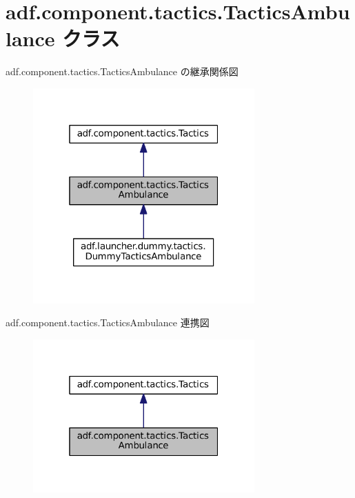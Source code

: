 \hypertarget{classadf_1_1component_1_1tactics_1_1TacticsAmbulance}{}\section{adf.\+component.\+tactics.\+Tactics\+Ambulance クラス}
\label{classadf_1_1component_1_1tactics_1_1TacticsAmbulance}


adf.\+component.\+tactics.\+Tactics\+Ambulance の継承関係図
\nopagebreak
\begin{figure}[H]
\begin{center}
\leavevmode
\includegraphics[width=241pt]{classadf_1_1component_1_1tactics_1_1TacticsAmbulance__inherit__graph}
\end{center}
\end{figure}


adf.\+component.\+tactics.\+Tactics\+Ambulance 連携図
\nopagebreak
\begin{figure}[H]
\begin{center}
\leavevmode
\includegraphics[width=241pt]{classadf_1_1component_1_1tactics_1_1TacticsAmbulance__coll__graph}
\end{center}
\end{figure}
